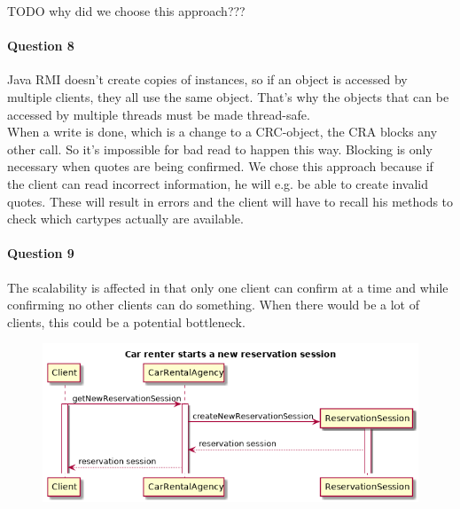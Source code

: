 \documentclass{ds-report}
\begin{document}
	TODO why did we choose this approach???
	
	\paragraph{Question 8} 
	Java RMI doesn't create copies of instances, so if an object is accessed by multiple clients, they all use the same object. That's why the objects that can be accessed by multiple threads must be made thread-safe.\\
	
	
	When a write is done, which is a change to a CRC-object, the CRA blocks any other call. So it's impossible for bad read to happen this way. Blocking is only necessary when quotes are being confirmed. We chose this approach because if the client can read incorrect information, he will e.g. be able to create invalid quotes. These will result in errors and the client will have to recall his methods to check which cartypes actually are available. 
	
	\paragraph{Question 9} 
	The scalability is affected in that only one client can confirm at a time and while confirming no other clients can do something. When there would be a lot of clients, this could be a potential bottleneck. 
	
	\clearpage
	
	
	\begin{landscape}
		\begin{figure}
			\centering
			\includegraphics[width=\paperwidth]{../diagrams/sequenceDiagrams/startSession.png}
		\end{figure}
	\end{landscape}
	
\end{document}
